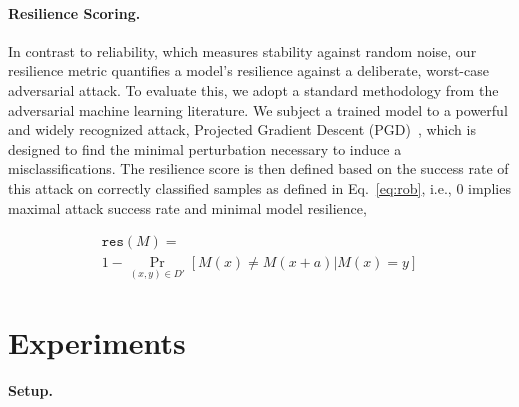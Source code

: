 \documentclass{uai2026}
\begin{document}

\paragraph{Resilience Scoring. }

In contrast to reliability, which measures stability against random noise, our resilience metric quantifies a model's resilience against a deliberate, worst-case adversarial attack. To evaluate this, we adopt a standard methodology from the adversarial machine learning literature. We subject a trained model to a powerful and widely recognized attack, Projected Gradient Descent (PGD)~\cite{madry2017towards}, which is designed to find the minimal perturbation necessary to induce a misclassifications. The resilience score is then defined based on the success rate of this attack on correctly classified samples as defined in Eq.~\eqref{eq:rob}, i.e., 0 implies maximal attack success rate and minimal model resilience,

\begin{equation}
    \label{eq:rob}
    \begin{aligned}
    \mathtt{res}(M) = \\
    1 -\Pr_{(x,y) \in D'}[M(x) \neq M(x+a)|M(x)=y]
    \end{aligned}
\end{equation}

\section{Experiments}
\label{sec:exp}

\paragraph{Setup. }
\end{document}
